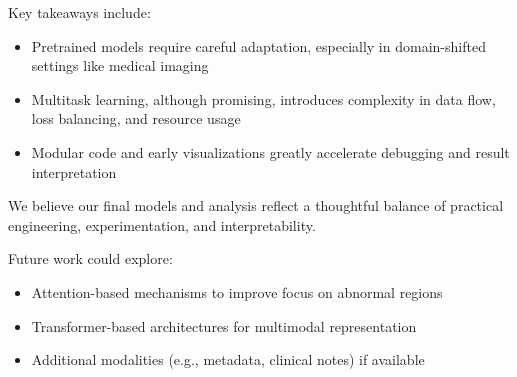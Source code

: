 \documentclass[11pt]{article}
\begin{document}
Key takeaways include:
\begin{itemize}
    \item Pretrained models require careful adaptation, especially in domain-shifted settings like medical imaging
    \item Multitask learning, although promising, introduces complexity in data flow, loss balancing, and resource usage
    \item Modular code and early visualizations greatly accelerate debugging and result interpretation
\end{itemize}

We believe our final models and analysis reflect a thoughtful balance of practical engineering, experimentation, and interpretability.

Future work could explore:
\begin{itemize}
    \item Attention-based mechanisms to improve focus on abnormal regions
    \item Transformer-based architectures for multimodal representation
    \item Additional modalities (e.g., metadata, clinical notes) if available
\end{itemize}
\end{document}
